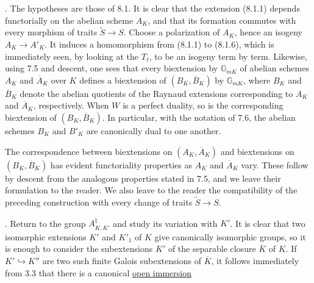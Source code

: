 
\medskip
{}. The hypotheses are those of 8.1. It is clear that the extension
(8.1.1) depends functorially on the abelian scheme $A_K$, and that
its formation commutes with every morphism of traits
$\widetilde S\longrightarrow S$. Choose a polarization of $A_K$,
hence an isogeny $A_K\longrightarrow A'_K$. It induces a
homomorphism from (8.1.1) to (8.1.6), which is immediately seen, by
looking at the $T_\ell$, to be an isogeny term by term. Likewise,
using 7.5 and descent, one sees that every biextension by
$\mathbb{G}_{mK}$ of abelian schemes $A_K$ and $\overline A_K$ over
$K$ defines a biextension of $(B_K,\overline B_K)$ by
$\mathbb{G}_{mK}$, where $B_K$ and $\overline B_K$ denote the
abelian quotients of the Raynaud extensions corresponding to $A_K$
and $\overline A_K$, respectively. When $W$ is a perfect duality, so
is the corresponding biextension of $(B_K,\overline B_K)$. In
particular, with the notation of 7.6, the abelian schemes $B_K$ and
$B'_K$ are canonically dual to one another.

The correspondence between biextensions on $(A_K,\overline A_K)$
and biextensions on $(B_K,\overline B_K)$ has evident functoriality
properties as $A_K$ and $\overline A_K$ vary. These follow by descent
from the analogous properties stated in 7.5, and we leave their
formulation to the reader. We also leave to the reader the
compatibility of the preceding construction with every change of
traits $\widetilde S\longrightarrow S$.

\medskip
{}. Return to the group $A_{K,K'}^{\natural}$ and study its
variation with $K'$. It is clear that two isomorphic extensions
$K'$ and $K'_1$ of $K$ give canonically isomorphic groups, so it is
enough to consider the subextensions $K'$ of the separable closure
$\overline K$ of $K$. If $K'\hookrightarrow K''$ are two such finite
Galois subextensions of $\overline K$, it follows immediately from
3.3 that there is a canonical \underline{open immersion}

